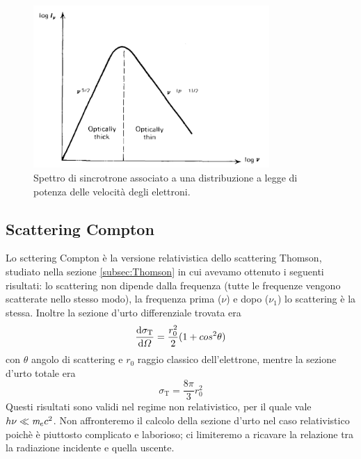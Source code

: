 \begin{figure}
\begin{center}
\includegraphics[width=0.8\textwidth]{img/Sincrotrone3}
\caption{Spettro di sincrotrone associato a una distribuzione a legge di potenza delle velocità degli elettroni.} \label{fig:Sincrotrone3}
\end{center}
\end{figure}

\subsection{Scattering Compton}
Lo scttering Compton è la versione relativistica dello scattering Thomson, studiato nella sezione \ref{subsec:Thomson} in cui avevamo ottenuto i seguenti risultati: lo scattering non dipende dalla frequenza (tutte le frequenze vengono scatterate nello stesso modo), la frequenza prima ($\nu$) e dopo ($\nu_1$) lo scattering è la stessa. Inoltre la sezione d'urto differenziale trovata era
\begin{equation}
\dfrac{\mathrm{d} {\sigma_\mathrm{T}}}{\mathrm{d} {\Omega}}=\dfrac{r_0^2}{2}(1+cos^2\theta)
\end{equation}
con $\theta$ angolo di scattering e $r_0$ raggio classico dell'elettrone, mentre la sezione d'urto totale era
\begin{equation}
\sigma_\mathrm{T} = \dfrac{8\pi}{3}r_0^2
\end{equation}
Questi risultati sono validi nel regime non relativistico, per il quale vale $h\nu \ll \textit{m}_{e} c^2$. Non affronteremo il calcolo della sezione d'urto nel caso relativistico poichè è piuttosto complicato e laborioso; ci limiteremo a ricavare la relazione tra la radiazione incidente e quella uscente. 

